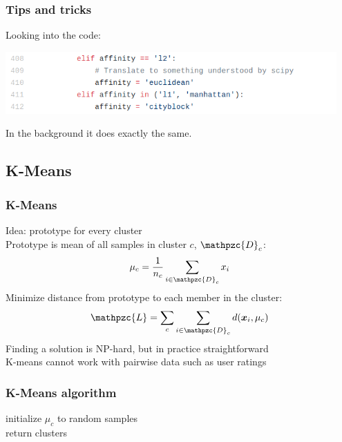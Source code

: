 \documentclass[Nike]{tuberlinbeamer}
\newcommand{\x}{\boldsymbol{x}}
\begin{document}
\begin{frame}
  \frametitle{Tips and tricks}
  Looking into the code:
  \begin{center}
    \centering\includegraphics[width=0.95\textwidth]{sklearn_code.png}
  \end{center}
  In the background it does exactly the same.
\end{frame}

\subsection{K-Means}
\begin{frame}
  \frametitle{K-Means}
  Idea: prototype for every cluster
  \\
  Prototype is mean of all samples in cluster $c$, $\mathpzc{D}_c$:
  \begin{equation*}
    \mu_c = \frac{1}{n_c} \sum_{i \in \mathpzc{D}_c} x_i
  \end{equation*}
  \pause
  Minimize distance from prototype to each member in the cluster:
  \begin{equation*}
    \mathpzc{L} = \sum_c \sum_{i \in \mathpzc{D}_c} d(\x_i, \mu_c)
  \end{equation*}
  \pause
  Finding a solution is NP-hard, but in practice straightforward
  \\
  K-means cannot work with pairwise data such as user ratings
\end{frame}


\begin{frame}
  \frametitle{K-Means algorithm}
  initialize $\mu_c$ to random samples\\
  return clusters
\end{frame}
\end{document}
